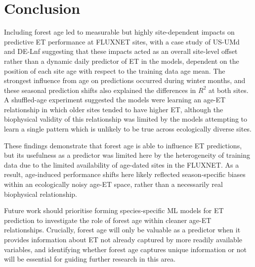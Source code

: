 \newpage
\section{Conclusion}
Including forest age led to measurable but highly site-dependent impacts on predictive ET performance at FLUXNET sites, with a case study of US-UMd and DE-Lnf suggesting that these impacts acted as an overall site-level offset rather than a dynamic daily predictor of ET in the models, dependent on the position of each site age with respect to the training data age mean. The strongest influence from age on predictions occurred during winter months, and these seasonal prediction shifts also explained the differences in $R^2$ at both sites. A shuffled-age experiment suggested the models were learning an age-ET relationship in which older sites tended to have higher ET, although the biophysical validity of this relationship was limited by the models attempting to learn a single pattern which is unlikely to be true across ecologically diverse sites.
\par These findings demonstrate that forest age is able to influence ET predictions, but its usefulness as a predictor was limited here by the heterogeneity of training data due to the limited availability of age-dated sites in the FLUXNET. As a result, age‑induced performance shifts here likely reflected season‑specific biases within an ecologically noisy age-ET space, rather than a necessarily real biophysical relationship. 
\par Future work should prioritise forming species‑specific ML models for ET prediction to investigate the role of forest age within cleaner age-ET relationships. Crucially, forest age will only be valuable as a predictor when it provides information about ET not already captured by more readily available variables, and identifying whether forest age captures unique information or not will be essential for guiding further research in this area.
\par 